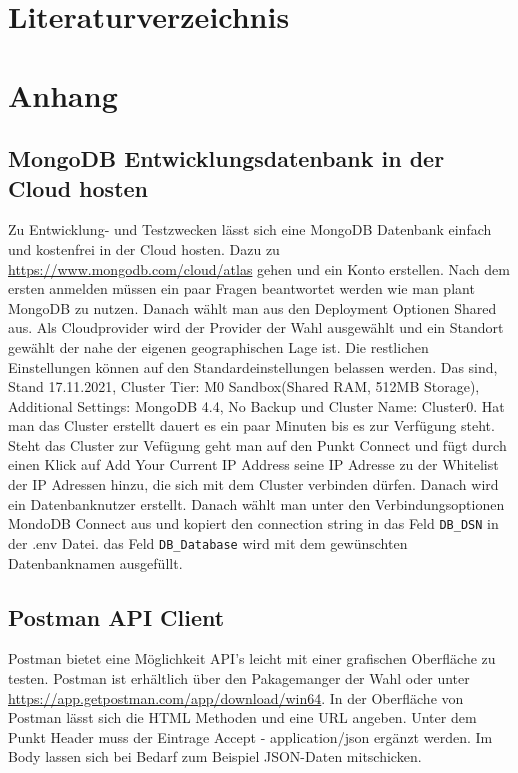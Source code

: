 \documentclass[12pt, a4paper, twoside]{article}
\begin{document}
\section{Literaturverzeichnis}


\renewcommand{\refname}{} 

%



\newpage


\appendix %
\section{Anhang}

\subsection{MongoDB Entwicklungsdatenbank in der Cloud hosten}

Zu Entwicklung- und Testzwecken lässt sich eine MongoDB Datenbank einfach und kostenfrei in der Cloud hosten. Dazu zu \url{https://www.mongodb.com/cloud/atlas} gehen und ein Konto erstellen. Nach dem ersten anmelden müssen ein paar Fragen beantwortet werden wie man plant MongoDB zu nutzen. Danach wählt man aus den Deployment Optionen Shared aus. Als Cloudprovider wird der Provider der Wahl ausgewählt und ein Standort gewählt der nahe der eigenen geographischen Lage ist. Die restlichen Einstellungen können auf den Standardeinstellungen belassen werden. Das sind, Stand 17.11.2021, Cluster Tier: M0 Sandbox(Shared RAM, 512MB Storage), Additional Settings: MongoDB 4.4, No Backup und Cluster Name: Cluster0. Hat man das Cluster erstellt dauert es ein paar Minuten bis es zur Verfügung steht. Steht das Cluster zur Vefügung geht man auf den Punkt Connect und fügt durch einen Klick auf Add Your Current IP Address seine IP Adresse zu der Whitelist der IP Adressen hinzu, die sich mit dem Cluster verbinden dürfen. Danach wird ein Datenbanknutzer erstellt. Danach wählt man unter den Verbindungsoptionen MondoDB Connect aus und kopiert den connection string in das Feld \texttt{DB_DSN} in der .env Datei. das Feld \texttt{DB_Database} wird mit dem gewünschten Datenbanknamen ausgefüllt.

\subsection{Postman API Client}

Postman bietet eine Möglichkeit API's leicht mit einer grafischen Oberfläche zu testen. Postman ist erhältlich über den Pakagemanger der Wahl oder unter \url{https://app.getpostman.com/app/download/win64}. In der Oberfläche von Postman lässt sich die HTML Methoden und eine URL angeben. Unter dem Punkt Header muss der Eintrage Accept - application/json ergänzt werden. Im Body lassen sich bei Bedarf zum Beispiel JSON-Daten mitschicken.
\end{document}

